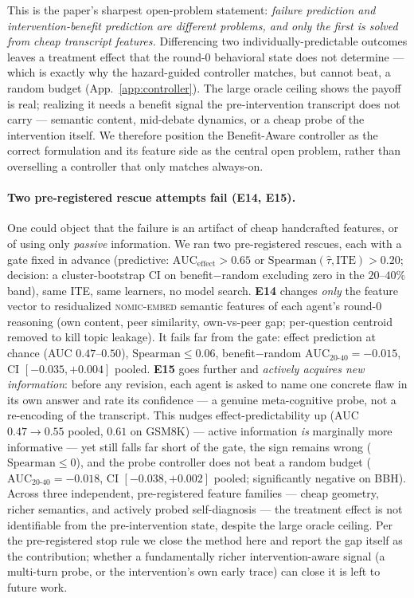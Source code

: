 This is the paper's sharpest open-problem statement: \emph{failure prediction and
intervention-benefit prediction are different problems, and only the first is solved from
cheap transcript features.} Differencing two individually-predictable outcomes leaves a
treatment effect that the round-0 behavioral state does not determine --- which is exactly
why the hazard-guided controller matches, but cannot beat, a random budget (App.~\ref{app:controller}).
The large oracle ceiling shows the payoff is real; realizing it needs a benefit signal the
pre-intervention transcript does not carry --- semantic content, mid-debate dynamics, or a
cheap probe of the intervention itself. We therefore position the Benefit-Aware controller
as the correct formulation and its feature side as the central open problem, rather than
overselling a controller that only matches always-on.

\paragraph{Two pre-registered rescue attempts fail (E14, E15).}
One could object that the failure is an artifact of cheap handcrafted features, or of
using only \emph{passive} information. We ran two pre-registered rescues, each with a gate
fixed in advance (predictive: $\mathrm{AUC}_{\text{effect}}>0.65$ or
$\mathrm{Spearman}(\hat\tau,\mathrm{ITE})>0.20$; decision: a cluster-bootstrap CI on
benefit$-$random excluding zero in the $20$--$40\%$ band), same ITE, same learners, no
model search. \textbf{E14} changes \emph{only} the feature vector to residualized
\textsc{nomic-embed} semantic features of each agent's round-0 reasoning (own content, peer
similarity, own-vs-peer gap; per-question centroid removed to kill topic leakage). It fails
far from the gate: effect prediction at chance (AUC $0.47$--$0.50$),
$\mathrm{Spearman}\le 0.06$, benefit$-$random $\mathrm{AUC}_{20\text{-}40}=-0.015$, CI
$[-0.035,+0.004]$ pooled. \textbf{E15} goes further and \emph{actively acquires new
information}: before any revision, each agent is asked to name one concrete flaw in its own
answer and rate its confidence --- a genuine meta-cognitive probe, not a re-encoding of the
transcript. This nudges effect-predictability up (AUC $0.47\!\to\!0.55$ pooled, $0.61$ on
GSM8K) --- active information \emph{is} marginally more informative --- yet still falls far
short of the gate, the sign remains wrong ($\mathrm{Spearman}\le 0$), and the probe
controller does not beat a random budget ($\mathrm{AUC}_{20\text{-}40}=-0.018$, CI
$[-0.038,+0.002]$ pooled; significantly negative on BBH). Across three independent,
pre-registered feature families --- cheap geometry, richer semantics, and actively probed
self-diagnosis --- the treatment effect is not identifiable from the pre-intervention state,
despite the large oracle ceiling. Per the pre-registered stop rule we close the method here
and report the gap itself as the contribution; whether a fundamentally richer
intervention-aware signal (a multi-turn probe, or the intervention's own early trace) can
close it is left to future work.

